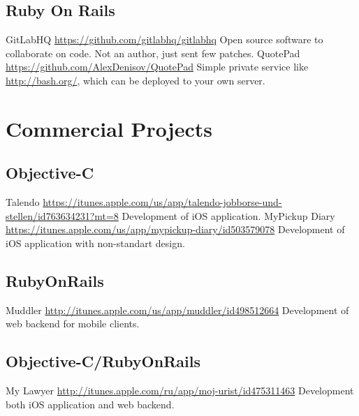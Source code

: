 \documentclass[11pt,a4paper]{moderncv}
\begin{document}
\subsection{Ruby On Rails}
\cvline
  {GitLabHQ}
  {\url{https://github.com/gitlabhq/gitlabhq}\newline{}
  Open source software to collaborate on code.\newline{}
  Not an author, just sent few patches.}
\cvline
  {QuotePad}
  {\url{https://github.com/AlexDenisov/QuotePad}\newline{}
  Simple private service like \url{http://bash.org/}, which can be deployed to your own server.}


\section{Commercial Projects}
  \subsection{Objective-C}
  \cvline
    {Talendo}
    {\url{https://itunes.apple.com/us/app/talendo-jobborse-und-stellen/id763634231?mt=8}\newline{}
    Development of iOS application.}
  \cvline
    {MyPickup Diary}
    {\url{https://itunes.apple.com/us/app/mypickup-diary/id503579078}\newline{}
    Development of iOS application with non-standart design.}
  \subsection{RubyOnRails}
  \cvline
    {Muddler}
    {\url{http://itunes.apple.com/us/app/muddler/id498512664}\newline{}
    Development of web backend for mobile clients.}
  \subsection{Objective-C/RubyOnRails}
  \cvline
    {My Lawyer}
    {\url{http://itunes.apple.com/ru/app/moj-urist/id475311463}\newline{}
    Development both iOS application and web backend.}
\end{document}

